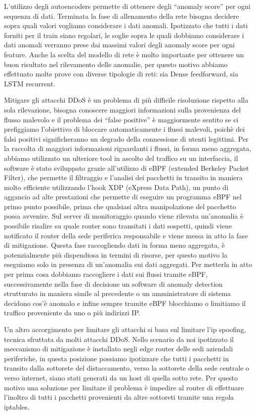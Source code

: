 L'utilizzo degli autoencoders permette di ottenere degli “anomaly score” per ogni sequenza di dati. Terminata la fase di allenamento della rete bisogna decidere sopra quali valori vogliamo considerare i dati anomali. Ipotizzato che tutti i dati forniti per il train siano regolari, le soglie sopra le quali dobbiamo considerare i dati anomali verranno prese dai massimi valori degli anomaly score per ogni feature. Anche la scelta del modello di rete è molto importante per ottenere un buon risultato nel rilevamento delle anomalie, per questo motivo abbiamo effettuato molte prove con diverse tipologie di reti: sia Dense feedforward, sia LSTM recurrent.

Mitigare gli attacchi DDoS è un problema di più difficile risoluzione rispetto alla sola rilevazione, bisogna conoscere maggiori informazioni sulla provenienza del flusso malevolo e il problema dei ``false positive'' è maggiormente sentito se ci prefiggiamo l'obiettivo di bloccare automaticamente i flussi malevoli, poichè dei falsi positivi significheranno un degrado della connessione di utenti legittimi.
Per la raccolta di maggiori informazioni riguardanti i flussi, in forma meno aggregata, abbiamo utilizzato un ulteriore tool in ascolto del traffico su un interfaccia, il software è stato sviluppato grazie all’utilizzo di eBPF (extended Berkeley Packet Filter), che permette il filtraggio e l'analisi dei pacchetti in transito in maniera molto efficiente utilizzando l’hook XDP (eXpress Data Path), un punto di aggancio ad alte prestazioni che permette di eseguire un programma eBPF nel primo punto possibile,  prima che qualsiasi altra manipolazione del pacchetto  possa avvenire.
Sul server di monitoraggio quando viene rilevata un'anomalia è possibile risalire su quale router sono transitati i dati sospetti, quindi viene notificato il router della sede periferica responsabile e viene messa in atto la fase di mitigazione. Questa fase raccogliendo dati in forma meno aggregata, è potenzialmente più dispendiosa in termini di risorse, per questo motivo la eseguiamo solo in presenza di un'anomalia sui dati aggregati.
Per metterla in atto per prima cosa dobbiamo raccogliere i dati sui flussi tramite eBPF, successivamente nella fase di decisione un software di anomaly detection strutturato in maniera simile al precedente o un amministratore di sistema decidono cos'è anomalo e infine sempre tramite eBPF blocchiamo o limitiamo il traffico proveniente da uno o più indirizzi IP.

Un altro accorgimento per limitare gli attacchi si basa sul limitare l’ip spoofing, tecnica sfruttata da molti attacchi DDoS. Nello scenario da noi ipotizzato il meccanismo di mitigazione è installato negli edge router delle sedi aziendali periferiche, in questa posizione possiamo ipotizzare che tutti i pacchetti in transito dalla sottorete del distaccamento, verso la sottorete della sede centrale o verso internet, siano stati generati da un host di quella sotto rete. Per questo motivo una soluzione per limitare il problema è impedire al router di effettuare l'inoltro di tutti i pacchetti provenienti da altre sottoreti tramite una regola iptables.


